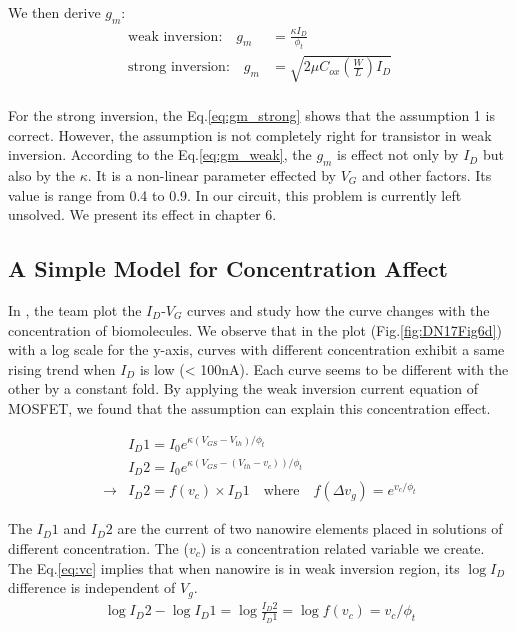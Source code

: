 We then derive $g_m$:
\begin{align}
    \text{weak inversion:} \quad g_m & = \frac{\kappa I_D}{\phi_t}\\ \label{eq:gm_weak}
    \text{strong inversion:} \quad g_m & = \sqrt{2 \mu C_{ox} (\frac{W}{L})I_{D}} \\ \label{eq:gm_strong}
\end{align}

For the strong inversion, the Eq.\ref{eq:gm_strong} shows that the assumption 1 is correct.
However, the assumption is not completely right for transistor in weak inversion.
According to the Eq.\ref{eq:gm_weak}, the $g_m$ is effect not only by $I_D$ but also by the $\kappa$.
It is a non-linear parameter effected by $V_G$ and other factors.
Its value is range from 0.4 to 0.9.
In our circuit, this problem is currently left unsolved.
We present its effect in chapter 6.


\subsection{A Simple Model for Concentration Affect}
In \cite{DN17}, the team plot the $I_D$-$V_G$ curves and study how the curve changes with the concentration of biomolecules.
We observe that in the plot (Fig.\ref{fig:DN17Fig6d}) with a log scale for the y-axis, curves with different concentration exhibit a same rising trend when $I_D$ is low (< 100nA).
Each curve seems to be different with the other by a constant fold.
By applying the weak inversion current equation of MOSFET, we found that the assumption can explain this concentration effect.

\begin{align}
    & I_D1 = I_{0} e^{\kappa(V_{GS} - V_{th}) / \phi_t} \\
    & I_D2 = I_{0} e^{\kappa(V_{GS} - (V_{th} - v_c)) / \phi_t} \\
    \rightarrow & I_D2 = f(v_c) \times I_D1 \quad \text{where} \quad f(\Delta v_g) = e^{v_c / \phi_t} \label{eq:vc}
\end{align}

The $I_D1$ and $I_D2$ are the current of two nanowire elements placed in solutions of different concentration.
The ($v_c$) is a concentration related variable we create.
The Eq.\ref{eq:vc} implies that when nanowire is in weak inversion region, its $\log I_D$ difference is independent of $V_g$.
\begin{align}
    \log I_D2 - \log I_D1 = \log \frac{I_D2}{I_D1} = \log f(v_c) = v_c / \phi_t
\end{align}

